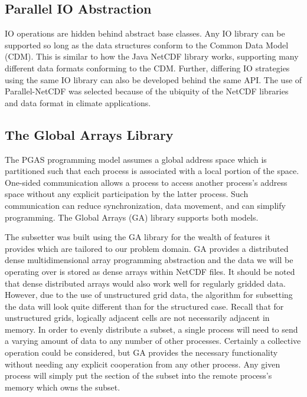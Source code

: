 \subsection{Parallel IO Abstraction}

IO operations are hidden behind abstract base classes.  Any IO library can be
supported so long as the data structures conform to the Common Data Model
(CDM)\cite{CDM}.  This is similar to how the Java NetCDF library works,
supporting many different data formats conforming to the CDM\cite{JavaNetCDF}.
Further, differing IO strategies using the same IO library can also be
developed behind the same API.  The use of Parallel-NetCDF was selected
because of the ubiquity of the NetCDF libraries and data format in climate
applications.

\subsection{The Global Arrays Library}

The PGAS programming model assumes a global address space which is partitioned
such that each process is associated with a local portion of the space.
One-sided communication allows a process to access another process's address
space without any explicit participation by the latter process.  Such
communication can reduce synchronization, data movement, and can simplify
programming.  The Global Arrays (GA) library supports both models.

The subsetter was built using the GA library for the wealth of features it
provides which are tailored to our problem domain.  GA provides a distributed
dense multidimensional array programming abstraction and the data we will be
operating over is stored as dense arrays within NetCDF files.  It should be
noted that dense distributed arrays would also work well for regularly gridded
data.  However, due to the use of unstructured grid data, the algorithm for
subsetting the data will look quite different than for the structured case.
Recall that for unstructured grids, logically adjacent cells are not
necessarily adjacent in memory.  In order to evenly distribute a subset, a
single process will need to send a varying amount of data to any number of
other processes.  Certainly a collective operation could be considered, but GA
provides the necessary functionality without needing any explicit cooperation
from any other process.  Any given process will simply put the section of the
subset into the remote process's memory which owns the subset.


